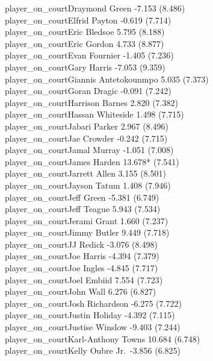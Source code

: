 \documentclass[
  landscape]{article}
\begin{document}
player\_on\_courtDraymond Green -7.153 (8.486)\\
player\_on\_courtElfrid Payton -0.619 (7.714)\\
player\_on\_courtEric Bledsoe 5.795 (8.188)\\
player\_on\_courtEric Gordon 4.733 (8.877)\\
player\_on\_courtEvan Fournier -1.405 (7.236)\\
player\_on\_courtGary Harris -7.053 (9.359)\\
player\_on\_courtGiannis Antetokounmpo 5.035 (7.373)\\
player\_on\_courtGoran Dragic -0.091 (7.242)\\
player\_on\_courtHarrison Barnes 2.820 (7.382)\\
player\_on\_courtHassan Whiteside 1.498 (7.715)\\
player\_on\_courtJabari Parker 2.967 (8.496)\\
player\_on\_courtJae Crowder -0.242 (7.715)\\
player\_on\_courtJamal Murray -1.051 (7.008)\\
player\_on\_courtJames Harden 13.678* (7.541)\\
player\_on\_courtJarrett Allen 3.155 (8.501)\\
player\_on\_courtJayson Tatum 1.408 (7.946)\\
player\_on\_courtJeff Green -5.381 (6.749)\\
player\_on\_courtJeff Teague 5.943 (7.534)\\
player\_on\_courtJerami Grant 1.660 (7.237)\\
player\_on\_courtJimmy Butler 9.449 (7.718)\\
player\_on\_courtJJ Redick -3.076 (8.498)\\
player\_on\_courtJoe Harris -4.394 (7.379)\\
player\_on\_courtJoe Ingles -4.845 (7.717)\\
player\_on\_courtJoel Embiid 7.554 (7.723)\\
player\_on\_courtJohn Wall 6.276 (6.827)\\
player\_on\_courtJosh Richardson -6.275 (7.722)\\
player\_on\_courtJustin Holiday -4.392 (7.115)\\
player\_on\_courtJustise Winslow -9.403 (7.244)\\
player\_on\_courtKarl-Anthony Towns 10.684 (6.748)\\
player\_on\_courtKelly Oubre Jr.~-3.856 (6.825)\\
\end{document}
